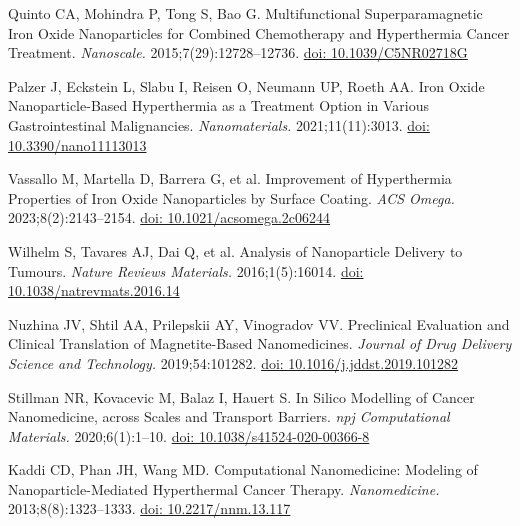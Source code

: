 \documentclass[Times1COL,AMA]{WileyNJDv5} %
\begin{document}
\begin{thebibliography}{10}
    Quinto CA, Mohindra P, Tong S, Bao G. Multifunctional Superparamagnetic Iron
    Oxide Nanoparticles for Combined Chemotherapy and Hyperthermia Cancer
    Treatment. {\it Nanoscale.} 2015\string;7(29)\string:12728--12736.
    \newblock \href {\doibase 10.1039/C5NR02718G} {doi: 10.1039/C5NR02718G}

    Palzer J, Eckstein L, Slabu I, Reisen O, Neumann UP, Roeth AA. Iron {{Oxide
                    Nanoparticle-Based Hyperthermia}} as a {{Treatment Option}} in {{Various
                    Gastrointestinal Malignancies}}. {\it Nanomaterials.}
    2021\string;11(11)\string:3013.
    \newblock \href {\doibase 10.3390/nano11113013} {doi: 10.3390/nano11113013}

    Vassallo M, Martella D, Barrera G, et al. Improvement of {{Hyperthermia
                    Properties}} of {{Iron Oxide Nanoparticles}} by {{Surface Coating}}. {\it ACS
    Omega.} 2023\string;8(2)\string:2143--2154.
    \newblock \href {\doibase 10.1021/acsomega.2c06244} {doi:
        10.1021/acsomega.2c06244}

    Wilhelm S, Tavares AJ, Dai Q, et al. Analysis of Nanoparticle Delivery to
    Tumours. {\it Nature Reviews Materials.} 2016\string;1(5)\string:16014.
    \newblock \href {\doibase 10.1038/natrevmats.2016.14} {doi:
        10.1038/natrevmats.2016.14}

    Nuzhina JV, Shtil AA, Prilepskii AY, Vinogradov VV. Preclinical {{Evaluation}}
    and {{Clinical Translation}} of {{Magnetite-Based Nanomedicines}}. {\it
    Journal of Drug Delivery Science and Technology.}
    2019\string;54\string:101282.
    \newblock \href {\doibase 10.1016/j.jddst.2019.101282} {doi:
        10.1016/j.jddst.2019.101282}

    Stillman NR, Kovacevic M, Balaz I, Hauert S. In Silico Modelling of Cancer
    Nanomedicine, across Scales and Transport Barriers. {\it npj Computational
            Materials.} 2020\string;6(1)\string:1--10.
    \newblock \href {\doibase 10.1038/s41524-020-00366-8} {doi:
        10.1038/s41524-020-00366-8}

    Kaddi CD, Phan JH, Wang MD. Computational Nanomedicine: Modeling of
    Nanoparticle-Mediated Hyperthermal Cancer Therapy. {\it Nanomedicine.}
    2013\string;8(8)\string:1323--1333.
    \newblock \href {\doibase 10.2217/nnm.13.117} {doi: 10.2217/nnm.13.117}


\end{thebibliography}
\end{document}
